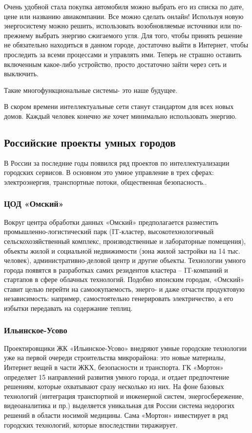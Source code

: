Очень удобной стала покупка автомобиля можно выбрать его из списка по дате, цене или названию авиакомпании. Все можно сделать онлайн! Используя новую энергосистему можно решить, использовать возобновляемые источники или по-прежнему выбрать энергию сжигаемого угля. Для того, чтобы принять решение не обязательно находиться в данном городе, достаточно выйти в Интернет, чтобы проследить за всеми процессами и управлять ими. Теперь не страшно оставить включенным какое-либо устройство, просто достаточно зайти через сеть и выключить. 

Такие многофункциональные системы- это наше будущее. 

В скором времени интеллектуальные сети станут стандартом для всех новых домов. Каждый человек конечно же хочет минимально использовать энергию.

\subsection{Российские проекты умных городов}
В России за последние годы появился ряд проектов по интеллектуализации городских сервисов. В основном это умное управление
в трех сферах: электроэнергия, транспортные потоки, общественная
безопасность.\cite{smartcity}.

\subsubsection{ЦОД «Омский»}
Вокруг центра обработки данных «Омский» предполагается разместить промышленно-логистический парк (IT-кластер, высокотехнологичный сельскохозяйственный комплекс, производственные и лабораторные помещения), объекты жилой и социальной недвижимости (зона жилой застройки на 14 тыс. человек), административно-деловой центр и другие
объекты. Технологии умного города появятся в разработках самих резидентов кластера – IT-компаний и стартапов в сфере облачных технологий. Подобно японским городам, «Омский» ставит целью перейти
на самоокупаемость, энерго- и даже отчасти продуктовую независимость: например, самостоятельно генерировать электричество, а его избытки передавать на содержание теплиц.

\subsubsection{Ильинское-Усово}
Проектировщики ЖК «Ильинское-Усово» внедряют умные городские технологии уже на первой очереди строительства микрорайона: это новые материалы, Интернет вещей в части ЖКХ, безопасности и транспорта. ГК «Мортон» определяет 15 направлений развития умного города, и отдает предпочтение решениям, которые охватывают сразу несколько из них. На фоне базовых технологий (интеграция транспортной и инженерной систем,
энергосбережение, видеоаналитика и пр.) выделяется уникальная для России система недорогих решений в области носимой медицины. Сама «Мортон» инвестирует в ряд городских технологий, которые впоследствии тиражирует.
